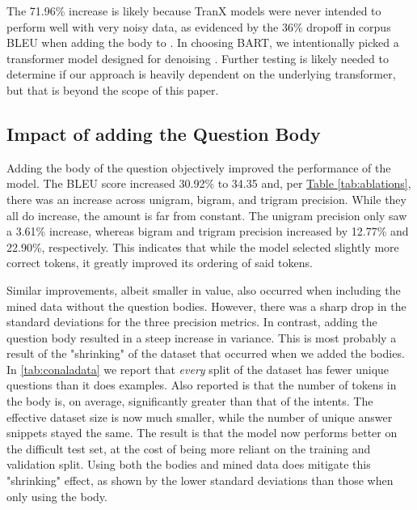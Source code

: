 \documentclass[11pt]{article}
\begin{document}
\indent The 71.96\% increase is likely because TranX models were never intended to perform well with very noisy data, as evidenced by the 36\% dropoff in corpus BLEU when adding the body to \citet{xu-etal-2020-incorporating}. In choosing BART, we intentionally picked a transformer model designed for denoising \citep{lewis-etal-2020-bart}. Further testing is likely needed to determine if our approach is heavily dependent on the underlying transformer, but that is beyond the scope of this paper.  
\subsection{Impact of adding the Question Body}
\indent Adding the body of the question objectively improved the performance of the model. The BLEU score increased 30.92\% to 34.35 and, per \hyperref[tab:ablations]{Table \ref{tab:ablations}}, there was an increase across unigram, bigram, and trigram precision. While they all do increase, the amount is far from constant. The unigram precision only saw a 3.61\% increase, whereas bigram and trigram precision increased by 12.77\% and 22.90\%, respectively. This indicates that while the model selected slightly more correct tokens, it greatly improved its ordering of said tokens.

\indent Similar improvements, albeit smaller in value, also occurred when including the mined data without the question bodies. However, there was a sharp drop in the standard deviations for the three precision metrics. In contrast, adding the question body resulted in a steep increase in variance. This is most probably a result of the "shrinking" of the dataset that occurred when we added the bodies. In \autoref{tab:conaladata} we report that \textit{every} split of the dataset has fewer unique questions than it does examples. Also reported is that the number of tokens in the body is, on average, significantly greater than that of the intents. The effective dataset size is now much smaller, while the number of unique answer snippets stayed the same. The result is that the model now performs better on the difficult test set, at the cost of being more reliant on the training and validation split. Using both the bodies and mined data does mitigate this "shrinking" effect, as shown by the lower standard deviations than those when only using the body.
\end{document}
